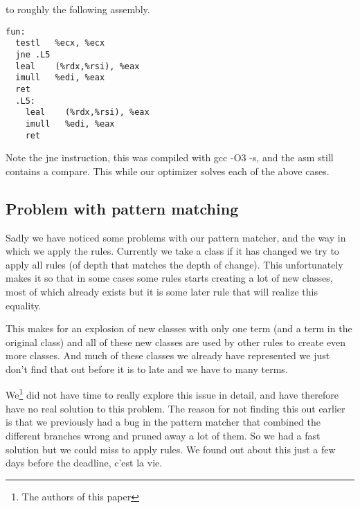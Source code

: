 to roughly the following assembly. 
\begin{verbatim}
fun:                                                                                 
  testl   %ecx, %ecx                                                               
  jne .L5                                                                          
  leal    (%rdx,%rsi), %eax                                                        
  imull   %edi, %eax                                                               
  ret                                                                              
  .L5:                                                                                 
    leal    (%rdx,%rsi), %eax                                                        
    imull   %edi, %eax                                                               
    ret                                                                              
\end{verbatim}
Note the jne instruction, this was
compiled with gcc -O3 -s, and the asm still contains a compare.
This while our optimizer solves each of the above cases.

\subsection{Problem with pattern matching}

Sadly we have noticed some problems with our pattern matcher, and the way in which
we apply the rules. Currently we take a class if it has changed we try to apply
all rules (of depth that matches the depth of change). This unfortunately makes it
so that in some cases some rules starts creating a lot of new classes, most of which 
already exists but it is some later rule that will realize this equality.

This makes for an explosion of new classes with only one term (and a term in the
original class) and all of these new classes are used by other rules to create even
more classes. And much of these classes we already have represented we just don't
find that out before it is to late and we have to many terms.

We\footnote{The authors of this paper} did not have time to really explore 
this issue in detail, and have therefore have
no real solution to this problem. The reason for not finding this out earlier is
that we previously had a bug in the pattern matcher that combined the different branches
wrong and pruned away a lot of them. So we had a fast solution but we could miss
to apply rules. We found out about this just a few days before the deadline, c'est
la vie.

